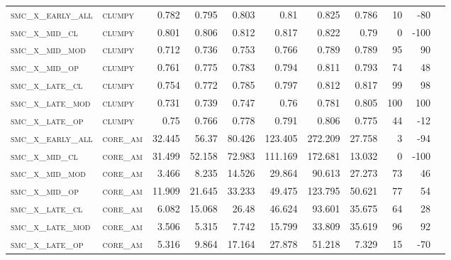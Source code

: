 \begin{landscape}
\begin{center}
\begin{footnotesize}
\begin{longtable}{llrrrrrr|rrr}
\textsc{smc\_x\_early\_all} & \textsc{clumpy    }   & 0.782      & 0.795      & 0.803      & 0.81       & 0.825      & 0.786      & 10    & -80    \\
\textsc{smc\_x\_mid\_cl   } & \textsc{clumpy    }   & 0.801      & 0.806      & 0.812      & 0.817      & 0.822      & 0.79       & 0     & -100   \\
\textsc{smc\_x\_mid\_mod  } & \textsc{clumpy    }   & 0.712      & 0.736      & 0.753      & 0.766      & 0.789      & 0.789      & 95    & 90     \\
\textsc{smc\_x\_mid\_op   } & \textsc{clumpy    }   & 0.761      & 0.775      & 0.783      & 0.794      & 0.811      & 0.793      & 74    & 48     \\
\textsc{smc\_x\_late\_cl  } & \textsc{clumpy    }   & 0.754      & 0.772      & 0.785      & 0.797      & 0.812      & 0.817      & 99    & 98     \\
\textsc{smc\_x\_late\_mod } & \textsc{clumpy    }   & 0.731      & 0.739      & 0.747      & 0.76       & 0.781      & 0.805      & 100   & 100    \\
\textsc{smc\_x\_late\_op  } & \textsc{clumpy    }   & 0.75       & 0.766      & 0.778      & 0.791      & 0.806      & 0.775      & 44    & -12    \\
\textsc{smc\_x\_early\_all} & \textsc{core\_am  }   & 32.445     & 56.37      & 80.426     & 123.405    & 272.209    & 27.758     & 3     & -94    \\
\textsc{smc\_x\_mid\_cl   } & \textsc{core\_am  }   & 31.499     & 52.158     & 72.983     & 111.169    & 172.681    & 13.032     & 0     & -100   \\
\textsc{smc\_x\_mid\_mod  } & \textsc{core\_am  }   & 3.466      & 8.235      & 14.526     & 29.864     & 90.613     & 27.273     & 73    & 46     \\
\textsc{smc\_x\_mid\_op   } & \textsc{core\_am  }   & 11.909     & 21.645     & 33.233     & 49.475     & 123.795    & 50.621     & 77    & 54     \\
\textsc{smc\_x\_late\_cl  } & \textsc{core\_am  }   & 6.082      & 15.068     & 26.48      & 46.624     & 93.601     & 35.675     & 64    & 28     \\
\textsc{smc\_x\_late\_mod } & \textsc{core\_am  }   & 3.506      & 5.315      & 7.742      & 15.799     & 33.809     & 35.619     & 96    & 92     \\
\textsc{smc\_x\_late\_op  } & \textsc{core\_am  }   & 5.316      & 9.864      & 17.164     & 27.878     & 51.218     & 7.329      & 15    & -70    \\

\end{longtable}
\end{footnotesize}
\end{center}
\end{landscape}
